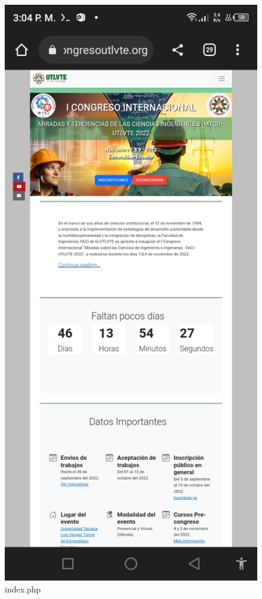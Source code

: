 \documentclass[a4paper,14px]{article}
\begin{document}
\begin{figure}[H]
  \centering
  \includegraphics[scale=0.6]{index.jpg}
  \caption{index.php }
  \label{fig:arquitectura}
\end{figure}
\end{document}
